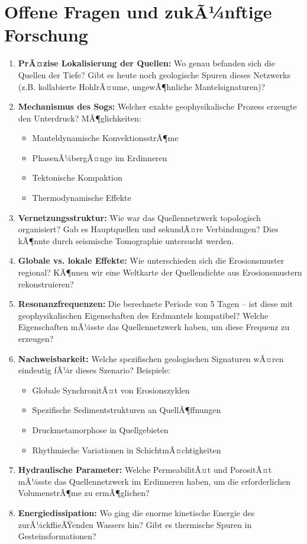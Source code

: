 ﻿\documentclass[12pt,a4paper]{report}
\begin{document}
\section{Offene Fragen und zukÃ¼nftige Forschung}

\begin{enumerate}
	\item \textbf{PrÃ¤zise Lokalisierung der Quellen:} Wo genau befanden sich die Quellen der Tiefe? Gibt es heute noch geologische Spuren dieses Netzwerks (z.B. kollabierte HohlrÃ¤ume, ungewÃ¶hnliche Mantelsignaturen)?
	
	\item \textbf{Mechanismus des Sogs:} Welcher exakte geophysikalische Prozess erzeugte den Unterdruck? MÃ¶glichkeiten:
	\begin{itemize}
		\item Manteldynamische KonvektionsstrÃ¶me
		\item PhasenÃ¼bergÃ¤nge im Erdinneren
		\item Tektonische Kompaktion
		\item Thermodynamische Effekte
	\end{itemize}
	
	\item \textbf{Vernetzungsstruktur:} Wie war das Quellennetzwerk topologisch organisiert? Gab es Hauptquellen und sekundÃ¤re Verbindungen? Dies kÃ¶nnte durch seismische Tomographie untersucht werden.
	
	\item \textbf{Globale vs. lokale Effekte:} Wie unterschieden sich die Erosionsmuster regional? KÃ¶nnen wir eine Weltkarte der Quellendichte aus Erosionsmustern rekonstruieren?
	
	\item \textbf{Resonanzfrequenzen:} Die berechnete Periode von 5 Tagen -- ist diese mit geophysikalischen Eigenschaften des Erdmantels kompatibel? Welche Eigenschaften mÃ¼sste das Quellennetzwerk haben, um diese Frequenz zu erzeugen?
	
	\item \textbf{Nachweisbarkeit:} Welche spezifischen geologischen Signaturen wÃ¤ren eindeutig fÃ¼r dieses Szenario? Beispiele:
	\begin{itemize}
		\item Globale SynchronitÃ¤t von Erosionszyklen
		\item Spezifische Sedimentstrukturen an QuellÃ¶ffnungen
		\item Druckmetamorphose in Quellgebieten
		\item Rhythmische Variationen in SchichtmÃ¤chtigkeiten
	\end{itemize}
	
	\item \textbf{Hydraulische Parameter:} Welche PermeabilitÃ¤t und PorositÃ¤t mÃ¼sste das Quellennetzwerk im Erdinneren haben, um die erforderlichen VolumenstrÃ¶me zu ermÃ¶g\-lichen?
	
	\item \textbf{Energiedissipation:} Wo ging die enorme kinetische Energie des zurÃ¼ckflieÃŸenden Wassers hin? Gibt es thermische Spuren in Gesteinsformationen?
\end{enumerate}
\end{document}
